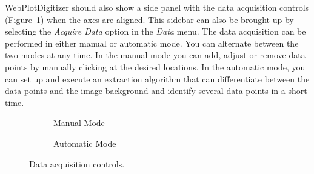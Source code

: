 \documentclass[letterpaper, 11pt]{article}
\begin{document}
WebPlotDigitizer should also show a side panel with the data acquisition controls (Figure~\ref{fig:acquireData}) when the axes are aligned. This sidebar can also be brought up by selecting the \emph{Acquire Data} option in the \emph{Data} menu. The data acquisition can be performed in either manual or automatic mode. You can alternate between the two modes at any time. In the manual mode you can add, adjust or remove data points by manually clicking at the desired locations. In the automatic mode, you can set up and execute an extraction algorithm that can differentiate between the data points and the image background and identify several data points in a short time.

\begin{figure}
\centering
{
\begin{subfigure}{0.35\textwidth}
\caption{Manual Mode}
\end{subfigure}
\hspace{5mm}
\begin{subfigure}{0.4\textwidth}
\caption{Automatic Mode}
\end{subfigure}
}
\caption{Data acquisition controls.}
\label{fig:acquireData}
\end{figure}
\end{document}
